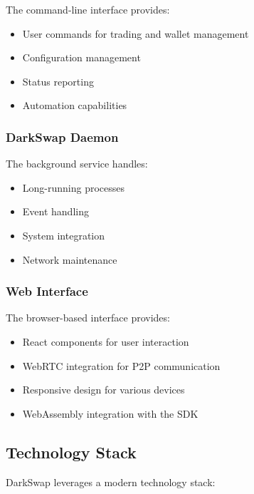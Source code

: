 \documentclass[11pt,a4paper]{article}
\begin{document}
The command-line interface provides:

\begin{itemize}
    \item User commands for trading and wallet management
    \item Configuration management
    \item Status reporting
    \item Automation capabilities
\end{itemize}

\subsubsection{DarkSwap Daemon}

The background service handles:

\begin{itemize}
    \item Long-running processes
    \item Event handling
    \item System integration
    \item Network maintenance
\end{itemize}

\subsubsection{Web Interface}

The browser-based interface provides:

\begin{itemize}
    \item React components for user interaction
    \item WebRTC integration for P2P communication
    \item Responsive design for various devices
    \item WebAssembly integration with the SDK
\end{itemize}

\subsection{Technology Stack}

DarkSwap leverages a modern technology stack:
\end{document}
